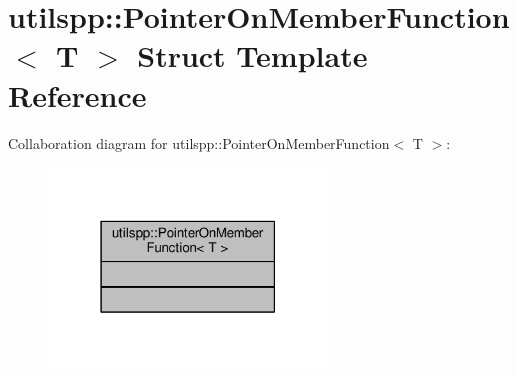 \hypertarget{structutilspp_1_1PointerOnMemberFunction}{\section{utilspp\-:\-:Pointer\-On\-Member\-Function$<$ T $>$ Struct Template Reference}
\label{structutilspp_1_1PointerOnMemberFunction}
}


Collaboration diagram for utilspp\-:\-:Pointer\-On\-Member\-Function$<$ T $>$\-:\nopagebreak
\begin{figure}[H]
\begin{center}
\leavevmode
\includegraphics[width=210pt]{structutilspp_1_1PointerOnMemberFunction__coll__graph}
\end{center}
\end{figure}
